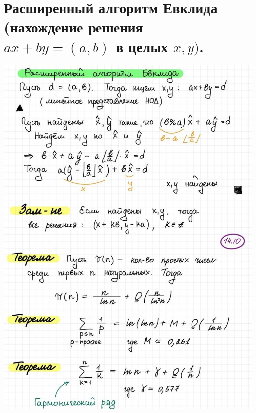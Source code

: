 \section{Расширенный алгоритм Евклида (нахождение решения $ax + by = (a, b)$ в целых $x, y)$.}
\includegraphics[width=1\linewidth]{images/Big_Evklid.jpg}

